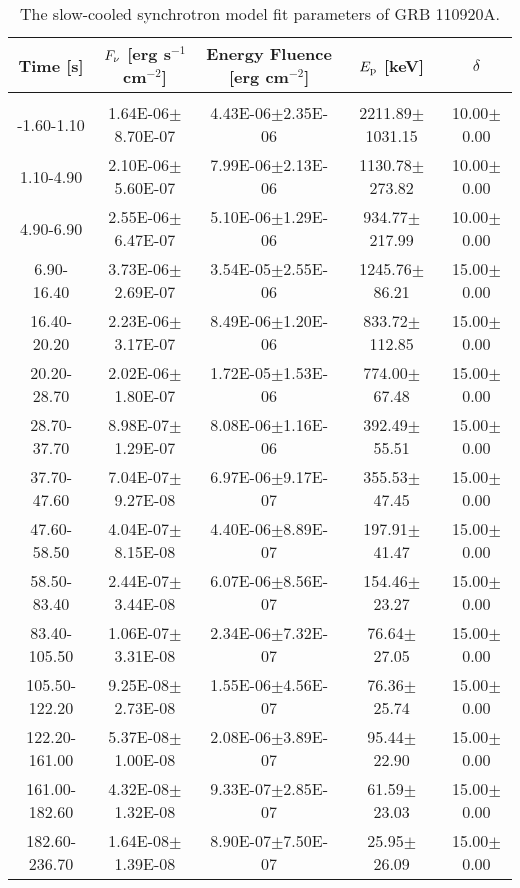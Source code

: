 \begin{table}[h]
\centering
\scriptsize
\label{tab:}
\begin{tabular}{c| c c c c}
Time [s] & $F_{\nu}$ [erg s$^{-1}$ cm$^{-2}$] & Energy Fluence [erg cm$^{-2}$] & $E_{\rm p}$ [keV] & $\delta$ \\
\hline \hline\\ 

-1.60-1.10 & 1.64E-06$\pm$8.70E-07 & 4.43E-06$\pm$2.35E-06 & 2211.89$\pm$1031.15 & 10.00$\pm$0.00 \\ 

1.10-4.90 & 2.10E-06$\pm$5.60E-07 & 7.99E-06$\pm$2.13E-06 & 1130.78$\pm$273.82 & 10.00$\pm$0.00 \\ 

4.90-6.90 & 2.55E-06$\pm$6.47E-07 & 5.10E-06$\pm$1.29E-06 & 934.77$\pm$217.99 & 10.00$\pm$0.00 \\ 

6.90-16.40 & 3.73E-06$\pm$2.69E-07 & 3.54E-05$\pm$2.55E-06 & 1245.76$\pm$86.21 & 15.00$\pm$0.00 \\ 

16.40-20.20 & 2.23E-06$\pm$3.17E-07 & 8.49E-06$\pm$1.20E-06 & 833.72$\pm$112.85 & 15.00$\pm$0.00 \\ 

20.20-28.70 & 2.02E-06$\pm$1.80E-07 & 1.72E-05$\pm$1.53E-06 & 774.00$\pm$67.48 & 15.00$\pm$0.00 \\ 

28.70-37.70 & 8.98E-07$\pm$1.29E-07 & 8.08E-06$\pm$1.16E-06 & 392.49$\pm$55.51 & 15.00$\pm$0.00 \\ 

37.70-47.60 & 7.04E-07$\pm$9.27E-08 & 6.97E-06$\pm$9.17E-07 & 355.53$\pm$47.45 & 15.00$\pm$0.00 \\ 

47.60-58.50 & 4.04E-07$\pm$8.15E-08 & 4.40E-06$\pm$8.89E-07 & 197.91$\pm$41.47 & 15.00$\pm$0.00 \\ 

58.50-83.40 & 2.44E-07$\pm$3.44E-08 & 6.07E-06$\pm$8.56E-07 & 154.46$\pm$23.27 & 15.00$\pm$0.00 \\ 

83.40-105.50 & 1.06E-07$\pm$3.31E-08 & 2.34E-06$\pm$7.32E-07 & 76.64$\pm$27.05 & 15.00$\pm$0.00 \\ 

105.50-122.20 & 9.25E-08$\pm$2.73E-08 & 1.55E-06$\pm$4.56E-07 & 76.36$\pm$25.74 & 15.00$\pm$0.00 \\ 

122.20-161.00 & 5.37E-08$\pm$1.00E-08 & 2.08E-06$\pm$3.89E-07 & 95.44$\pm$22.90 & 15.00$\pm$0.00 \\ 

161.00-182.60 & 4.32E-08$\pm$1.32E-08 & 9.33E-07$\pm$2.85E-07 & 61.59$\pm$23.03 & 15.00$\pm$0.00 \\ 

182.60-236.70 & 1.64E-08$\pm$1.39E-08 & 8.90E-07$\pm$7.50E-07 & 25.95$\pm$26.09 & 15.00$\pm$0.00 \\ 

\end{tabular}
\caption{The slow-cooled synchrotron model fit parameters of GRB 110920A.}
\end{table}

